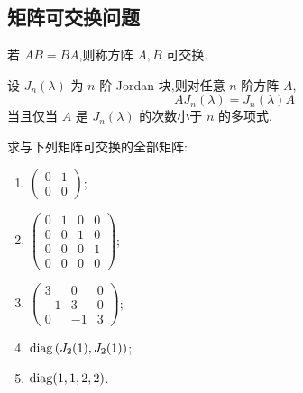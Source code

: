 \subsection{矩阵可交换问题}

若 $AB=BA$,则称方阵 $A,B$ 可交换.

\begin{proposition}[\markstar]
设 $J_n(\lambda)$ 为 $n$ 阶 Jordan 块,则对任意 $n$ 阶方阵 $A$,
\[
AJ_n(\lambda)=J_n(\lambda)A
\]
当且仅当 $A$ 是 $J_n(\lambda)$ 的次数小于 $n$ 的多项式.
\end{proposition}

\begin{example}
求与下列矩阵可交换的全部矩阵:
\begin{enumerate}
  \item $\begin{pmatrix}0&1\\0&0\end{pmatrix}$;
  \item $\begin{pmatrix}0&1&0&0\\0&0&1&0\\0&0&0&1\\0&0&0&0\end{pmatrix}$;
  \item $\begin{pmatrix}3&0&0\\-1&3&0\\0&-1&3\end{pmatrix}$;
  \item $\operatorname{diag}\left(J_2(1),J_2(1)\right)$;
  \item $\operatorname{diag}(1,1,2,2)$.
\end{enumerate}
\end{example}
\exampleblank

